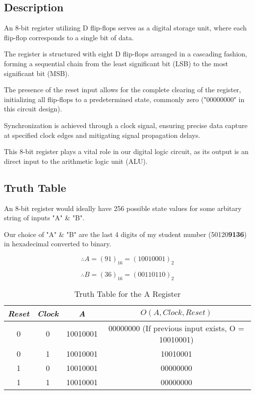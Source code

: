 
\subsection{{Description}}

	{An 8-bit register utilizing D flip-flops serves as a digital storage unit, where each flip-flop corresponds to a single bit of data.} 
	
	{The register is structured with eight D flip-flops arranged in a cascading fashion, forming a sequential chain from the least significant bit (LSB) to the most significant bit (MSB).} 
	
	{The presence of the reset input allows for the complete clearing of the register, initializing all flip-flops to a predetermined state, commonly zero ("00000000" in this circuit design).} 
	
	{Synchronization is achieved through a clock signal, ensuring precise data capture at specified clock edges and mitigating signal propagation delays.} 
	
	{This 8-bit register plays a vital role in our digital logic circuit, as its output is an direct input to the arithmetic logic unit (ALU).}

\subsection{{Truth Table}}

	{An 8-bit register would ideally have 256 possible state values for some arbitary string of inputs "A" \& "B".}
	
	{Our choice of "A" \& "B" are the last 4 digits of my student number (50120\textbf{9136}) in hexadecimal converted to binary.}
	
	{$$\therefore A = (91)_{16} = (10010001)_{2}$$}
	
	{$$\therefore B = (36)_{16} = (00110110)_{2}$$}

	\begin{table}[H]
		\centering
		\begin{tabular}{|c|c|c|c|}
		\hline
		\hline
			\textit{Reset} & \textit{Clock} & \textit{A} & $O(A, Clock, Reset)$ \\ 
		\hline
		\hline
			0 & 0 & 10010001 & 00000000 (If previous input exists, O = 10010001) \\ 
			\hline
			0 & 1 & 10010001 & 10010001 \\ 
			\hline
			1 & 0 & 10010001 & 00000000 \\ 
			\hline
			1 & 1 & 10010001 & 00000000 \\ 
		\hline
		\hline
    		\end{tabular}
    		\caption{Truth Table for the A Register}
	\end{table}
	

